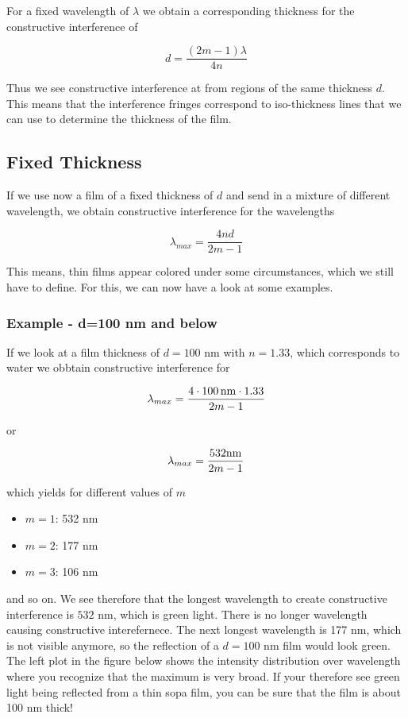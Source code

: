 \documentclass[
  a4paper,
]{book}
\providecommand{\tightlist}{%
  \setlength{\itemsep}{0pt}\setlength{\parskip}{0pt}}
\begin{document}
For a fixed wavelength of \(\lambda\) we obtain a corresponding
thickness for the constructive interference of

\[
d=\frac{(2m-1)\lambda}{4n}
\]

Thus we see constructive interference at from regions of the same
thickness \(d\). This means that the interference fringes correspond to
iso-thickness lines that we can use to determine the thickness of the
film.

\subsection{Fixed Thickness}\label{fixed-thickness}

If we use now a film of a fixed thickness of \(d\) and send in a mixture
of different wavelength, we obtain constructive interference for the
wavelengths

\[
\lambda_{max}=\frac{4nd}{2m-1}
\]

This means, thin films appear colored under some circumstances, which we
still have to define. For this, we can now have a look at some examples.

\subsubsection{Example - d=100 nm and
below}\label{example---d100-nm-and-below}

If we look at a film thickness of \(d=100\) nm with \(n=1.33\), which
corresponds to water we obbtain constructive interference for

\[
\lambda_{max}=\frac{4\cdot 100\, {\rm nm} \cdot 1.33}{2m-1}
\]

or

\[
\lambda_{max}=\frac{ 532 {\rm nm}}{2m-1}
\]

which yields for different values of \(m\)

\begin{itemize}
\tightlist
\item
  \(m=1\): 532 nm
\item
  \(m=2\): 177 nm
\item
  \(m=3\): 106 nm
\end{itemize}

and so on. We see therefore that the longest wavelength to create
constructive interference is \(532\) nm, which is green light. There is
no longer wavelength causing constructive interefernece. The next
longest wavelength is 177 nm, which is not visible anymore, so the
reflection of a \(d=100\) nm film would look green. The left plot in the
figure below shows the intensity distribution over wavelength where you
recognize that the maximum is very broad. If your therefore see green
light being reflected from a thin sopa film, you can be sure that the
film is about 100 nm thick!
\end{document}
